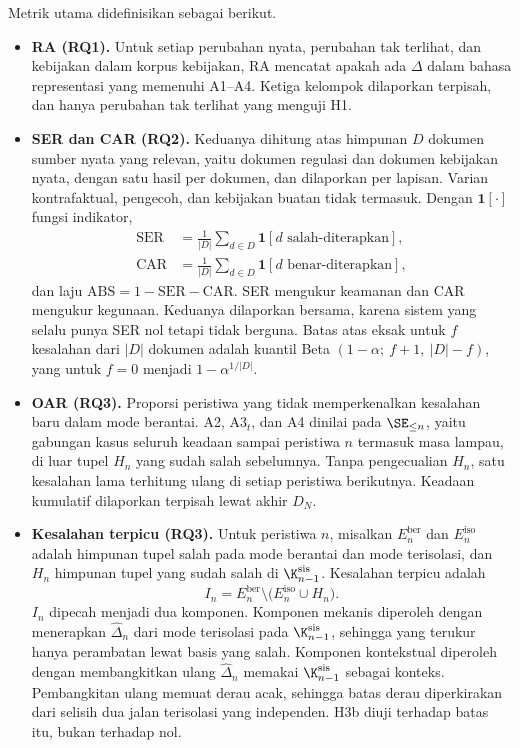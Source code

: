 Metrik utama didefinisikan sebagai berikut.
\begin{itemize}[leftmargin=*,nosep]
  \item \textbf{RA (RQ1).} Untuk setiap perubahan nyata, perubahan tak terlihat, dan kebijakan dalam korpus kebijakan, RA mencatat apakah ada $\Delta$ dalam bahasa representasi yang memenuhi A1--A4. Ketiga kelompok dilaporkan terpisah, dan hanya perubahan tak terlihat yang menguji H1.
  \item \textbf{SER dan CAR (RQ2).} Keduanya dihitung atas himpunan $D$ dokumen sumber nyata yang relevan, yaitu dokumen regulasi dan dokumen kebijakan nyata, dengan satu hasil per dokumen, dan dilaporkan per lapisan. Varian kontrafaktual, pengecoh, dan kebijakan buatan tidak termasuk. Dengan $\mathbf{1}[\cdot]$ fungsi indikator,
  \begin{align}
  \mathrm{SER} &= \tfrac{1}{|D|}\textstyle\sum_{d \in D} \mathbf{1}[d \text{ salah-diterapkan}], \label{eq:ser}\\
  \mathrm{CAR} &= \tfrac{1}{|D|}\textstyle\sum_{d \in D} \mathbf{1}[d \text{ benar-diterapkan}], \nonumber
  \end{align}
  dan laju  $\mathrm{ABS} = 1 - \mathrm{SER} - \mathrm{CAR}$. SER mengukur keamanan dan CAR mengukur kegunaan. Keduanya dilaporkan bersama, karena sistem yang selalu  punya SER nol tetapi tidak berguna. Batas atas eksak untuk $f$ kesalahan dari $|D|$ dokumen adalah kuantil Beta $(1-\alpha;\ f+1,\ |D|-f)$, yang untuk $f=0$ menjadi $1-\alpha^{1/|D|}$.
  \item \textbf{OAR (RQ3).} Proporsi peristiwa yang tidak memperkenalkan kesalahan baru dalam mode berantai. A2, A3$_t$, dan A4 dinilai pada $\SE_{\leq n}$, yaitu gabungan kasus seluruh keadaan sampai peristiwa $n$ termasuk masa lampau, di luar tupel $H_n$ yang sudah salah sebelumnya. Tanpa pengecualian $H_n$, satu kesalahan lama terhitung ulang di setiap peristiwa berikutnya. Keadaan kumulatif dilaporkan terpisah lewat  akhir $D_N$.
  \item \textbf{Kesalahan terpicu (RQ3).} Untuk peristiwa $n$, misalkan $E^{\mathrm{ber}}_n$ dan $E^{\mathrm{iso}}_n$ adalah himpunan tupel salah pada mode berantai dan mode terisolasi, dan $H_n$ himpunan tupel yang sudah salah di $\K^{\mathrm{sis}}_{n-1}$. Kesalahan terpicu adalah
  \begin{equation}
  I_n = E^{\mathrm{ber}}_n \setminus \big(E^{\mathrm{iso}}_n \cup H_n\big).
  \label{eq:terpicu}
  \end{equation}
  $I_n$ dipecah menjadi dua komponen. Komponen mekanis diperoleh dengan menerapkan $\hat{\Delta}_n$ dari mode terisolasi pada $\K^{\mathrm{sis}}_{n-1}$, sehingga yang terukur hanya perambatan lewat basis yang salah. Komponen kontekstual diperoleh dengan membangkitkan ulang $\hat{\Delta}_n$ memakai $\K^{\mathrm{sis}}_{n-1}$ sebagai konteks. Pembangkitan ulang memuat derau acak, sehingga batas derau diperkirakan dari selisih dua jalan terisolasi yang independen. H3b diuji terhadap batas itu, bukan terhadap nol.

\end{itemize}
